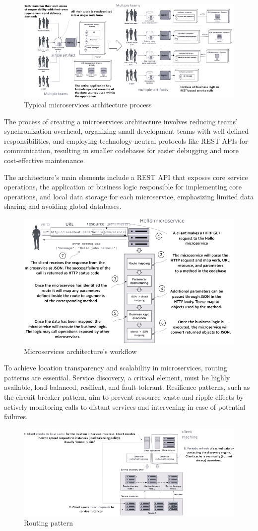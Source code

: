 \begin{figure}[H]
    \centering
    \includegraphics[width=0.6\linewidth]{images/msa.png}
    \caption{Typical microservices architecture process}
\end{figure}
The process of creating a microservices architecture involves reducing teams' synchronization overhead, organizing small development teams with well-defined responsibilities, and employing technology-neutral protocols like REST APIs for communication, resulting in smaller codebases for easier debugging and more cost-effective maintenance.

The architecture's main elements include a REST API that exposes core service operations, the application or business logic responsible for implementing core operations, and local data storage for each microservice, emphasizing limited data sharing and avoiding global databases.
\begin{figure}[H]
    \centering
    \includegraphics[width=0.5\linewidth]{images/wf.png}
    \caption{Microservices architecture's workflow}
\end{figure}

To achieve location transparency and scalability in microservices, routing patterns are essential.
Service discovery, a critical element, must be highly available, load-balanced, resilient, and fault-tolerant. 
Resilience patterns, such as the circuit breaker pattern, aim to prevent resource waste and ripple effects by actively monitoring calls to distant services and intervening in case of potential failures.
\begin{figure}[H]
    \centering
    \includegraphics[width=0.75\linewidth]{images/rp.png}
    \caption{Routing pattern}
\end{figure}

